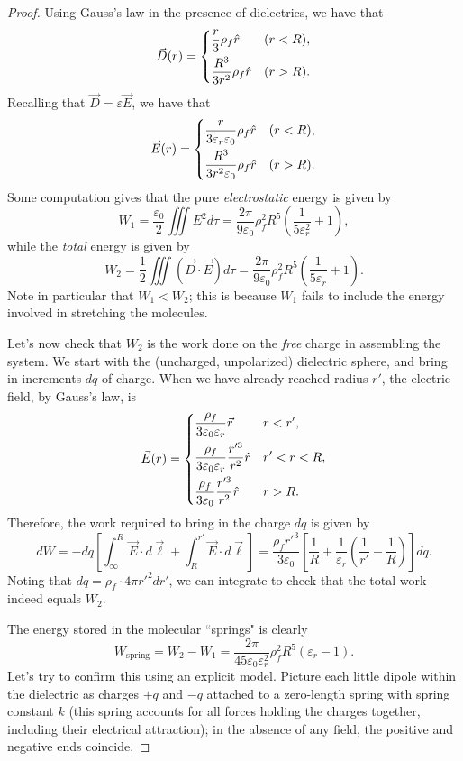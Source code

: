 \begin{proof}
Using Gauss's law in the presence of dielectrics, we have that
\[\vec{D}(r)=\begin{dcases}
\frac{r}{3}\rho_f\hat{r} & (r<R),\\
\frac{R^3}{3r^2}\rho_f\hat{r} & (r>R).
\end{dcases}\]
Recalling that $\vec{D}=\varepsilon \vec{E}$, we have that
\[\vec{E}(r)=\begin{dcases}
\frac{r}{3\varepsilon_r\varepsilon_0}\rho_f\hat{r} & (r<R),\\
\frac{R^3}{3r^2\varepsilon_0}\rho_f\hat{r} & (r>R).
\end{dcases}\]
Some computation gives that the pure \textit{electrostatic} energy is given by
\[W_1=\frac{\varepsilon_0}{2}\iiint E^2d\tau =\frac{2\pi}{9\varepsilon_0}\rho_f^2R^5\left(\frac{1}{5\varepsilon_r^2}+1\right),\]
while the \textit{total} energy is given by
\[W_2=\frac{1}{2}\iiint (\vec{D}\cdot\vec{E})d\tau=\frac{2\pi}{9\varepsilon_0}\rho_f^2R^5\left(\frac{1}{5\varepsilon_r}+1\right).\]
Note in particular that $W_1<W_2$; this is because $W_1$ fails to include the energy involved in stretching the molecules. 

Let's now check that $W_2$ is the work done on the \textit{free} charge in assembling the system. We start with the (uncharged, unpolarized) dielectric sphere, and bring in increments $dq$ of charge. When we have already reached radius $r'$, the electric field, by Gauss's law, is
\[\vec{E}(r)=\begin{dcases}
\frac{\rho_f}{3\varepsilon_0\varepsilon_r}\vec{r} & r<r',\\
\frac{\rho_f}{3\varepsilon_0\varepsilon_r}\frac{r'^3}{r^2}\hat{r} & r'<r<R,\\
\frac{\rho_f}{3\varepsilon_0}\frac{r'^3}{r^2}\hat{r} & r>R.
\end{dcases}\]
Therefore, the work required to bring in the charge $dq$ is given by
\[dW=-dq\left[\int_\infty^R\vec{E}\cdot d\vec{\ell}+\int_R^{r'}\vec{E}\cdot d\vec{\ell}\right]=\frac{\rho_fr'^3}{3\varepsilon_0}\left[\frac{1}{R}+\frac{1}{\varepsilon_r}\left(\frac{1}{r'}-\frac{1}{R}\right)\right]dq.\]
Noting that $dq=\rho_f\cdot 4\pi r'^2dr'$, we can integrate to check that the total work indeed equals $W_2$.

The energy stored in the molecular ``springs" is clearly
\[W_{\text{spring}}=W_2-W_1=\frac{2\pi}{45\varepsilon_0\varepsilon_r^2}\rho_f^2R^5(\varepsilon_r-1).\]
Let's try to confirm this using an explicit model. Picture each little dipole within the dielectric as charges $+q$ and $-q$ attached to a zero-length spring with spring constant $k$ (this spring accounts for all forces holding the charges together, including their electrical attraction); in the absence of any field, the positive and negative ends coincide.


\end{proof}
